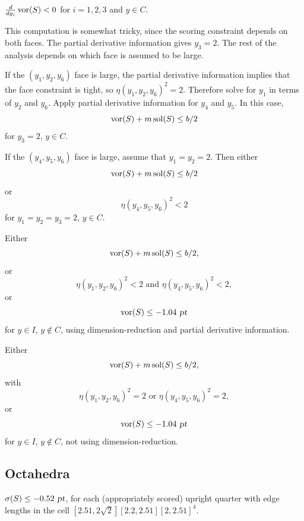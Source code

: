 \begin{calcf}
$\frac{d}{dy_i}\operatorname{vor}(S) < 0$ for $i=1,2,3$ and $y \in C$.
\label{flat:partials}
\end{calcf}


\begin{calcf}
This computation is somewhat tricky, since the scoring
constraint depends on both faces.  The partial derivative
information gives $y_3=2$.  The rest of the
analysis depends on which face is assumed to be large.

If the $(y_1, y_2, y_6)$ face is large, the partial derivative
information implies that the face constraint
is tight, so $\eta(y_1,y_2,y_6)^2=2$.  Therefore solve
for $y_1$ in terms of $y_2$ and $y_6$.  Apply partial
derivative information for $y_4$ and $y_5$.
In this case,
\[\operatorname{vor}(S) + m \operatorname{sol}(S) \le b/2\]
for $y_3=2$, $y \in C$.

If the $(y_4,y_5,y_6)$ face is large, assume that
$y_1=y_2=2$.  Then either
\[\operatorname{vor}(S) + m \operatorname{sol}(S) \le b/2\]
or
\[\eta(y_4,y_5,y_6)^2 < 2\]
for $y_1=y_2=y_3=2$, $y \in C$.
\label{flat:corner}
\end{calcf}

\begin{calcf}
Either
\[\operatorname{vor}(S) + m \operatorname{sol}(S) \le b/2,\]
or
\[\eta(y_1,y_2,y_6)^2 < 2 \text{~and~} \eta(y_4, y_5, y_6)^2 < 2,\]
or
\[\operatorname{vor}(S) \le -1.04\text{ \sl pt}\]
for $y \in I$, $y \notin C$, using dimension-reduction and partial
derivative information.
\label{flat:vor:dimred}
\end{calcf}

\begin{calcf}
Either
\[\operatorname{vor}(S) + m \operatorname{sol}(S) \le b/2,\]
with
\[\eta(y_1,y_2,y_6)^2 = 2 \text{~or~} \eta(y_4, y_5, y_6)^2 = 2,\]
or
\[\operatorname{vor}(S) \le -1.04\text{ \sl pt}\]
for $y \in I$, $y \notin C$, not using dimension-reduction.
\label{flat:vor:bdry}
\end{calcf}


\subsection{Octahedra}

\begin{calcf}
$\operatorname{\sigma}(S) \le -0.52 \text{ \sl pt}$,
for each (appropriately scored) upright quarter
with edge lengths in the cell
$[2.51,2\sqrt{2}][2.2,2.51][2,2.51]^4$.
\label{octa:peel}
\end{calcf}

